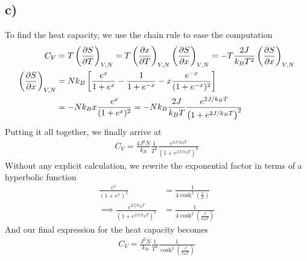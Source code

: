 \documentclass[reprint,english,notitlepage,aps,nobalancelastpage,nofootinbib]{revtex4-1}
\newcommand{\closed}[1]{\left(#1\right)}
\newcommand{\bracket}[1]{\left[#1\right]}
\newcommand{\tmdv}[4]{\closed{\pdv{#1}{#2}}_{#3,#4}}
\newcommand{\kb}{k_B}
\begin{document}
\subsection*{c)}
To find the heat capacity, we use the chain rule to ease the computation 
\begin{align*}
	C_V &= T\tmdv{S}{T}{V}{N} = T \tmdv{x}{T}{V}{N}\tmdv{S}{x}{V}{N} = -T\frac{2J}{\kb T^2}\tmdv{S}{x}{V}{N} \\ 
	\tmdv{S}{x}{V}{N} &= N\kb \bracket{\frac{e^x}{1+e^x} - \frac{1}{1+e^{-x}} -x \frac{e^{-x}}{(1+e^{-x})^2} } \\ 
	&= - N\kb x \frac{e^x}{(1+e^x)^2} = -N\kb \frac{2J}{\kb T} \frac{e^{2J/\kb T}}{\closed{1+e^{2J/\kb T}}^2}
\end{align*}
Putting it all together, we finally arrive at 
\begin{align*}
	C_V = \frac{4J^2 N}{\kb} \frac{1}{T^2} \frac{e^{2J/\kb T}}{\closed{1+e^{2J/\kb T}}^2}
\end{align*}
Without any explicit calculation, we rewrite the exponential factor in terms of a hyperbolic function 
\begin{align*}
	\frac{e^x}{(1+e^x)^2} &= \frac{1}{4\cosh^2(\frac{x}{2})} \\
	\implies \frac{e^{2J/\kb T}}{\closed{1+e^{2J/\kb T}}^2} &= \frac{1}{4 \cosh^2\closed{\frac{J}{\kb T}}}
\end{align*}
And our final expression for the heat capacity becomes 
\begin{align}
	C_V = \frac{J^2 N}{\kb} \frac{1}{T^2} \frac{1}{\cosh^2\closed{\frac{J}{\kb T}}}
\end{align}
\end{document}
